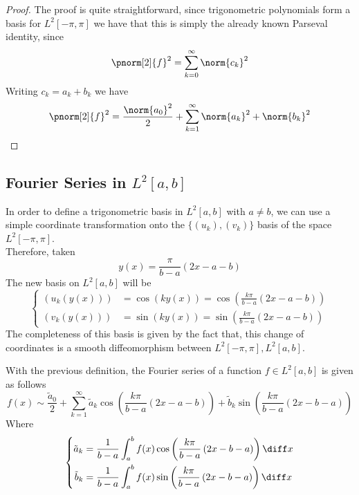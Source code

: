 \documentclass[../mmf.tex]{subfiles}
\begin{document}
\begin{proof}
	The proof is quite straightforward, since trigonometric polynomials form a basis for $L^2[-\pi,\pi]$ we have that this is simply the already known Parseval identity, since
	\begin{equation*}
		\pnorm[2]{f}^2=\sum_{k=0}^{\infty}\norm{c_k}^2
	\end{equation*}
	Writing $c_k=a_k+b_k$ we have
	\begin{equation*}
		\pnorm[2]{f}^2=\frac{\norm{a_0}^2}{2}+\sum_{k=1}^{\infty}\norm{a_k}^2+\norm{b_k}^2
	\end{equation*}
\end{proof}
\subsection{Fourier Series in $L^2[a,b]$}
\begin{dfn}
	In order to define a trigonometric basis in $L^2[a,b]$ with $a\ne b$, we can use a simple coordinate transformation onto the $\{(u_k),(v_k)\}$ basis of the space $L^2[-\pi,\pi]$.\\
	Therefore, taken
	\begin{equation*}
		y(x)=\frac{\pi}{b-a}(2x-a-b)
	\end{equation*}
	The new basis on $L^2[a,b]$ will be
	\begin{equation*}
		\left\{ \begin{aligned}
				(u_k(y(x)))&=\cos(ky(x))=\cos\left(\frac{k\pi}{b-a}(2x-a-b)\right)\\
				(v_k(y(x)))&=\sin(ky(x))=\sin\left( \frac{k\pi}{b-a}\left( 2x-a-b \right) \right)
		\end{aligned}\right.
	\end{equation*}
	The completeness of this basis is given by the fact that, this change of coordinates is a smooth diffeomorphism between $L^2[-\pi,\pi],L^2[a,b]$.
\end{dfn}
\begin{dfn}
	With the previous definition, the Fourier series of a function $f\in L^2[a,b]$ is given as follows
	\begin{equation}
		f(x)\sim\frac{\tilde{a}_0}{2}+\sum_{k=1}^{\infty}\tilde{a}_k\cos\left( \frac{k\pi}{b-a}(2x-a-b) \right)+\tilde{b}_k\sin\left( \frac{k\pi}{b-a}(2x-b-a) \right)
		\label{eq:fouserab}
	\end{equation}
	Where
	\begin{equation}
		\left\{ \begin{aligned}
				\tilde{a}_k&=\frac{1}{b-a}\int_{a}^{b}f(x)\cos\left( \frac{k\pi}{b-a}\left( 2x-b-a \right) \right)\diff x\\
				\tilde{b}_k&=\frac{1}{b-a}\int_{a}^{b}f(x)\sin\left( \frac{k\pi}{b-a}\left( 2x-b-a \right) \right)\diff x
		\end{aligned}\right.
		\label{eq:fouserabcoef}
	\end{equation}
\end{dfn}
\end{document}
